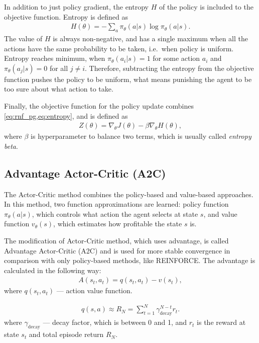\documentclass{article}
\begin{document}
In addition to just policy gradient, the entropy $H$ of the policy is included
to the objective function. Entropy is defined as
\begin{align}
  \label{eq:entropy}
  H(\theta) = - \sum_a \pi_{\theta}(a | s) \log \pi_{\theta}(a | s).
\end{align}
The value of $H$ is always non-negative, and has a single maximum
when all the actions have the same probability to be taken, i.e.\ when
policy is uniform. Entropy reaches minimum, when
$\pi_{\theta}(a_i | s) = 1$ for some action $a_i$ and
$\pi_{\theta}(a_j | s) = 0$ for all $j \neq i$. Therefore,
subtracting the entropy from the objective function pushes the policy to be uniform,
what means punishing the agent to be too sure about what action to take.

Finally, the objective function for the policy update combines
\cref{eq:rnf_pg,eq:entropy}, and is defined as
\begin{align}
  \label{eq:rnf_objective}
  Z(\theta) = \nabla_\theta J(\theta) - \beta \nabla_\theta H(\theta),
\end{align}
where $\beta$ is hyperparameter to balance two terms, which is usually
called \textit{entropy beta}.

\subsection{Advantage Actor-Critic (A2C)}\label{subsubsec:a2c}

The Actor-Critic method combines the policy-based and value-based approaches.
In this method, two function approximations are learned: policy function
$\pi_{\theta}(a|s)$, which controls what action the agent selects at state $s$,
and value function $v_{\theta}(s)$, which estimates how profitable the state
$s$ is.

The modification of Actor-Critic method, which uses advantage, is called
Advantage Actor-Critic (A2C) and is used for more stable convergence in
comparison with only policy-based methods, like REINFORCE. The advantage is
calculated in the following way:
\begin{align*}
  A(s_t, a_t) = q(s_t,a_t)- v(s_t),
\end{align*}
where $ q(s_t,a_t)$ --- action value function.

\begin{align}\label{eq:q_estimation}
  q(s,a) \approx R_N = \sum_{t=1}^N \gamma^{N-t}_\text{decay} r_t.
\end{align}
where $\gamma_\text{decay}$ --- decay factor, which is between 0 and 1,
and $r_t$ is the reward at state $s_t$ and total episode return $R_N$.
\end{document}
